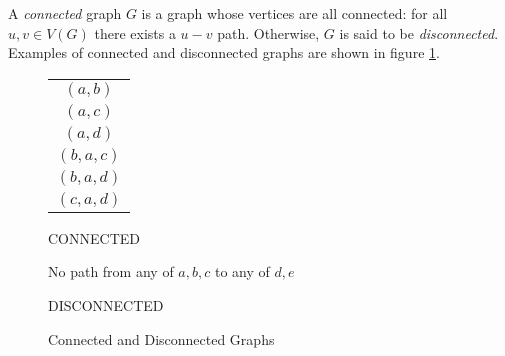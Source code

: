 A \emph{connected} graph \(G\) is a graph whose vertices are all connected: for all \(u,v\in V(G)\) there exists a
\(u-v\) path.  Otherwise, \(G\) is said to be \emph{disconnected}.  Examples of connected and disconnected graphs
are shown in figure \ref{fig:connect}.

\begin{figure}[h]
  \label{fig:connect}
  \begin{minipage}[t]{2.5in}
    \begin{center}

      \bigskip

      \begin{tabular}{c}
        \((a,b)\) \\
        \((a,c)\) \\
        \((a,d)\) \\
        \((b,a,c)\) \\
        \((b,a,d)\) \\
        \((c,a,d)\)
      \end{tabular}

      \bigskip
      
      CONNECTED
    \end{center}
  \end{minipage}
  \begin{minipage}[t]{3in}
    \begin{center}

      \bigskip
      
      No path from any of \(a,b,c\) to any of \(d,e\)

      \bigskip

      DISCONNECTED
    \end{center}
  \end{minipage}
  \caption{Connected and Disconnected Graphs}
\end{figure}

